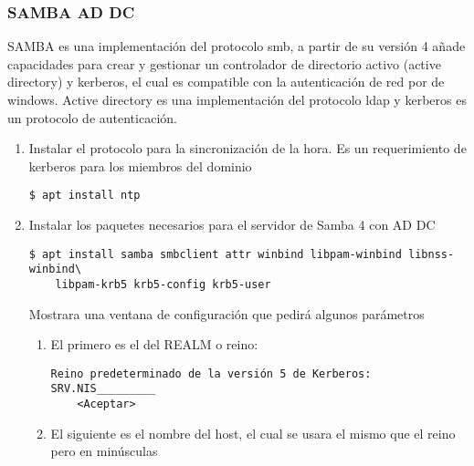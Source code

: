 \documentclass[../main.tex]{subfiles}
\begin{document}
\subsubsection{SAMBA AD DC}\label{sec:samba_addc}

SAMBA es una implementación del protocolo smb, a partir de su
versión 4 añade capacidades para crear y gestionar un controlador
de directorio activo (active directory) y kerberos, el cual es
compatible con la autenticación de red por de windows. Active
directory es una implementación del protocolo ldap y kerberos
es un protocolo de autenticación.

\begin{enumerate}
  \item Instalar el protocolo para la sincronización de la hora.
        Es un requerimiento de kerberos para los miembros del dominio

        \begin{listing}[H]
\begin{verbatim}
$ apt install ntp
\end{verbatim}
\end{listing}

  \item Instalar los paquetes necesarios para el servidor de
        Samba 4 con AD DC

        \begin{listing}[H]
\begin{verbatim}
$ apt install samba smbclient attr winbind libpam-winbind libnss-winbind\
    libpam-krb5 krb5-config krb5-user
\end{verbatim}
\end{listing}

        Mostrara una ventana de configuración que pedirá algunos parámetros

        \begin{enumerate}
          \item El primero es el del REALM o reino:

                \begin{listing}[H]
\begin{verbatim}
Reino predeterminado de la versión 5 de Kerberos:
SRV.NIS_________
    <Aceptar>
\end{verbatim}
\end{listing}


          \item El siguiente es el nombre del host, el cual se usara el mismo
                que el reino pero en minúsculas


\end{enumerate}
\end{enumerate}
\end{document}
